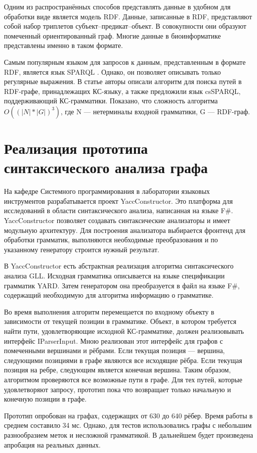 \documentclass[14pt]{matmex-diploma}
\begin{document}
Одним из распространённых способов представлять данные в удобном для обработки виде является модель RDF. Данные, записанные в RDF, представляют собой набор триплетов субъект--предикат--объект. В совокупности они образуют помеченный ориентированный граф. Многие данные в биоинформатике представлены именно в таком формате.

Самым популярным языком для запросов к данным, представленным в формате RDF, является язык SPARQL \cite{prud2008sparql}. Однако, он позволяет описывать только регулярные выражения. В статье \cite{zhang2016context} авторы описали алгоритм для поиска путей в RDF-графе, принадлежащих КС-языку, а также предложили язык  csSPARQL, поддерживающий КС-грамматики. Показано, что сложность алгоритма $O((|N|*|G|)^3)$, где N --- нетерминалы входной грамматики, G --- RDF-граф.
\section{Реализация прототипа синтаксического анализа графа}
На кафедре Системного программирования в лаборатории языковых инструментов разрабатывается проект YaccConstructor. Это платформа для исследований в области синтаксического анализа, написанная на языке F\#. YaccConstructor позволяет создавать синтаксические анализаторы и имеет модульную архитектуру. Для построения анализатора  выбирается фронтенд для обработки грамматик, выполняются необходимые преобразования и по указанному генератору строится нужный результат.

В YaccConstructor есть абстрактная реализация алгоритма синтаксического анализа GLL. Исходная грамматика описывается на языке спецификации грамматик YARD. Затем генератором она преобразуется в файл на языке F\#, содержащий необходимую для алгоритма информацию о грамматике.

Во время выполнения алгоритм перемещается по входному объекту в зависимости от текущей позиции в грамматике. Объект, в котором требуется найти пути, удовлетворяющие исходной КС-грамматике, должен реализовывать интерфейс IParserInput. Мною реализован этот интерфейс для графов  с помеченными вершинами и рёбрами. Если текущая позиция --- вершина, следующими позициями в графе являются все исходящие рёбра. Если текущая позиция на ребре, следующим является конечная вершина. Таким образом, алгоритмом проверяются все возможные пути в графе. Для тех путей, которые удовлетворяют запросу, прототип пока что возвращает только начальную и конечную позиции в графе.

Прототип опробован на графах, содержащих от 630 до 640 рёбер. Время работы в среднем составило 34 мс. Однако, для тестов использовались графы с небольшим разнообразием меток и несложной грамматикой. В дальнейшем будет произведена апробация на реальных данных.
\end{document}
